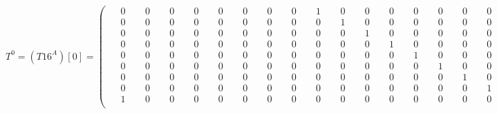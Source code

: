 \documentclass[10pt]{article}
\begin{document}
\[
T^{0} = (T16^A)[0] = \left(\begin{smallmatrix}
\phantom{-}0 & \phantom{-}0 & \phantom{-}0 & \phantom{-}0 & \phantom{-}0 & \phantom{-}0 & \phantom{-}0 & \phantom{-}0 & \phantom{-}1 & \phantom{-}0 & \phantom{-}0 & \phantom{-}0 & \phantom{-}0 & \phantom{-}0 & \phantom{-}0 & \phantom{-}0 \\
\phantom{-}0 & \phantom{-}0 & \phantom{-}0 & \phantom{-}0 & \phantom{-}0 & \phantom{-}0 & \phantom{-}0 & \phantom{-}0 & \phantom{-}0 & \phantom{-}1 & \phantom{-}0 & \phantom{-}0 & \phantom{-}0 & \phantom{-}0 & \phantom{-}0 & \phantom{-}0 \\
\phantom{-}0 & \phantom{-}0 & \phantom{-}0 & \phantom{-}0 & \phantom{-}0 & \phantom{-}0 & \phantom{-}0 & \phantom{-}0 & \phantom{-}0 & \phantom{-}0 & \phantom{-}1 & \phantom{-}0 & \phantom{-}0 & \phantom{-}0 & \phantom{-}0 & \phantom{-}0 \\
\phantom{-}0 & \phantom{-}0 & \phantom{-}0 & \phantom{-}0 & \phantom{-}0 & \phantom{-}0 & \phantom{-}0 & \phantom{-}0 & \phantom{-}0 & \phantom{-}0 & \phantom{-}0 & \phantom{-}1 & \phantom{-}0 & \phantom{-}0 & \phantom{-}0 & \phantom{-}0 \\
\phantom{-}0 & \phantom{-}0 & \phantom{-}0 & \phantom{-}0 & \phantom{-}0 & \phantom{-}0 & \phantom{-}0 & \phantom{-}0 & \phantom{-}0 & \phantom{-}0 & \phantom{-}0 & \phantom{-}0 & \phantom{-}1 & \phantom{-}0 & \phantom{-}0 & \phantom{-}0 \\
\phantom{-}0 & \phantom{-}0 & \phantom{-}0 & \phantom{-}0 & \phantom{-}0 & \phantom{-}0 & \phantom{-}0 & \phantom{-}0 & \phantom{-}0 & \phantom{-}0 & \phantom{-}0 & \phantom{-}0 & \phantom{-}0 & \phantom{-}1 & \phantom{-}0 & \phantom{-}0 \\
\phantom{-}0 & \phantom{-}0 & \phantom{-}0 & \phantom{-}0 & \phantom{-}0 & \phantom{-}0 & \phantom{-}0 & \phantom{-}0 & \phantom{-}0 & \phantom{-}0 & \phantom{-}0 & \phantom{-}0 & \phantom{-}0 & \phantom{-}0 & \phantom{-}1 & \phantom{-}0 \\
\phantom{-}0 & \phantom{-}0 & \phantom{-}0 & \phantom{-}0 & \phantom{-}0 & \phantom{-}0 & \phantom{-}0 & \phantom{-}0 & \phantom{-}0 & \phantom{-}0 & \phantom{-}0 & \phantom{-}0 & \phantom{-}0 & \phantom{-}0 & \phantom{-}0 & \phantom{-}1 \\
\phantom{-}1 & \phantom{-}0 & \phantom{-}0 & \phantom{-}0 & \phantom{-}0 & \phantom{-}0 & \phantom{-}0 & \phantom{-}0 & \phantom{-}0 & \phantom{-}0 & \phantom{-}0 & \phantom{-}0 & \phantom{-}0 & \phantom{-}0 & \phantom{-}0 & \phantom{-}0 \\

\end{smallmatrix}\]
\end{document}
